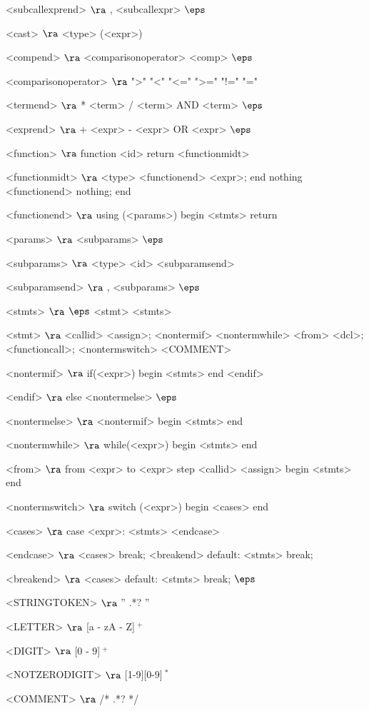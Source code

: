 \begin{grammar}
<subcallexprend> $\ra$ , <subcallexpr>
\alt$\eps$

<cast> $\ra$ <type> (<expr>)

<compend> $\ra$ <comparisonoperator> <comp>
\alt$\eps$

<comparisonoperator> $\ra$ ">"
				\alt "<"
				\alt "<="
				\alt ">="
				\alt "!="
				\alt "="

<termend> $\ra$ * <term>
\alt / <term>
\alt AND <term>
\alt$\eps$

<exprend> $\ra$ + <expr>
\alt - <expr>
\alt OR <expr>
\alt$\eps$

<function> $\ra$ function <id> return <functionmidt>

<functionmidt> $\ra$ <type> <functionend> <expr>; end
\alt nothing <functionend> nothing; end

<functionend> $\ra$
using (<params>)
begin
	<stmts>
	return

<params> $\ra$ <subparams>
	\alt$\eps$

<subparams> $\ra$ <type> <id> <subparamsend>

<subparamsend> $\ra$ , <subparams>
\alt$\eps$

<stmts> $\ra$ $\eps$
	\alt <stmt> <stmts>

<stmt> $\ra$ <callid> <assign>;
	\alt <nontermif>
	\alt <nontermwhile>
	\alt <from>
	\alt <dcl>;
	\alt <functioncall>;
	\alt <nontermswitch>
	\alt <COMMENT>
	
<nontermif> $\ra$ if(<expr>)
	begin
		<stmts>
	end
	<endif>

<endif> $\ra$ 
	else <nontermelse>
	\alt$\eps$

<nontermelse> $\ra$ <nontermif>
	\alt begin
		<stmts>
	end

<nontermwhile> $\ra$ while(<expr>)
		begin
			<stmts>
		end
		
<from> $\ra$ from <expr> to <expr> step <callid> <assign>
	begin
		<stmts>
	end

<nontermswitch> $\ra$ switch (<expr>)
		begin
			<cases>
		end

<cases> $\ra$ case <expr>:
			<stmts>
		<endcase>
		
<endcase> $\ra$ <cases>
		\alt break; <breakend>
		\alt default:
			<stmts>
			break;

<breakend> $\ra$ <cases>
\alt default:
<stmts>
break;
\alt$\eps$

<STRINGTOKEN> $\ra$ '' .*? '' 

<LETTER> $\ra$ [a - zA - Z]$~^+$

<DIGIT> $\ra$ [0 - 9]$~^+$

<NOTZERODIGIT> $\ra$ [1-9][0-9]$~^*$

<COMMENT> $\ra$ /* .*? */


\end{grammar}